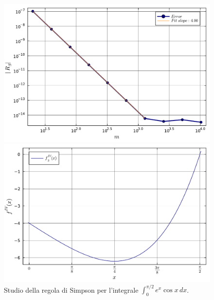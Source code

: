 \documentclass[letterpaper, 12pt]{article}
\begin{document}
\begin{figure}[!ht]
    \centering
    \begin{minipage}[b]{0.47\textwidth}
        \includegraphics[width=\textwidth]{5143.pdf}
    \end{minipage}
    \hspace{0.5cm}
    \begin{minipage}[b]{0.47\textwidth}
        \includegraphics[width=\textwidth]{5143_2.pdf}
    \end{minipage}
    \caption{Studio della regola di Simpson per l'integrale $\int_0^{\pi/2}e^x \cos x\, dx$.}
    \label{fig:es5_1_4_3}
\end{figure}
\end{document}
